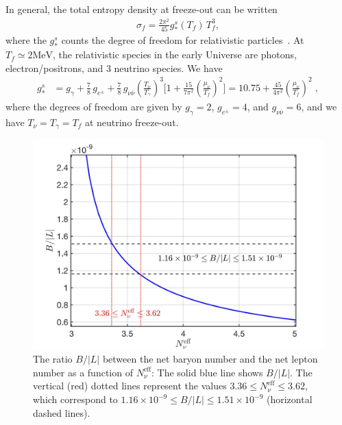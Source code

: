 In general, the total entropy density at freeze-out can be written
\begin{align}
\label{eq:EntropyDensity}
\sigma_f=\frac{2\pi^2}{45}g^s_\ast(T_f)\,T_f^3,
\end{align}
where the $g^s_\ast$ counts the degree of freedom for relativistic particles~\cite{Kolb:1990vq}. At $T_f\simeq 2\mathrm{MeV}$, the relativistic species in the early Universe are photons, electron/positrons, and $3$ neutrino species. We have
\begin{align}
g^s_{\ast}&= g_\gamma+\frac{7}{8}\,g_{e^\pm}+\frac{7}{8}\,g_{\nu\bar{\nu}}\left(\frac{T_\nu}{T_\gamma}\right)^{\!\!3}\bigg[1+\frac{15}{7\pi^2}\left(\frac{\mu_\nu}{T_f}\right)^{\!\!2}\bigg]=10.75+\frac{45}{4\pi^2}\left(\frac{\mu_\nu}{T_f}\right)^{\!\!2}\;,
\end{align}
where the degrees of freedom are given by $g_\gamma=2$, $g_{e^\pm}=4$, and $g_{\nu\bar{\nu}}=6$, and we have $T_\nu=T_\gamma=T_f$ at neutrino freeze-out.

\begin{figure}
\begin{center}
\includegraphics[width=0.9\linewidth]{./plots/Ratio_BL}
\caption{The ratio $B/|L|$ between the net baryon number and the net lepton number as a function of $N^{\mathrm{eff}}_\nu$: The solid blue line shows $B/|L|$. The vertical (red) dotted lines represent the values $3.36\leqslant N_\nu^{\mathrm{eff}}\leqslant3.62$, which correspond to $1.16 \times 10^{-9}\leqslant B/|L|\leqslant 1.51 \times 10^{-9}$ (horizontal dashed lines). }
\label{fig:BLRatio}
\end{center}
\end{figure}

